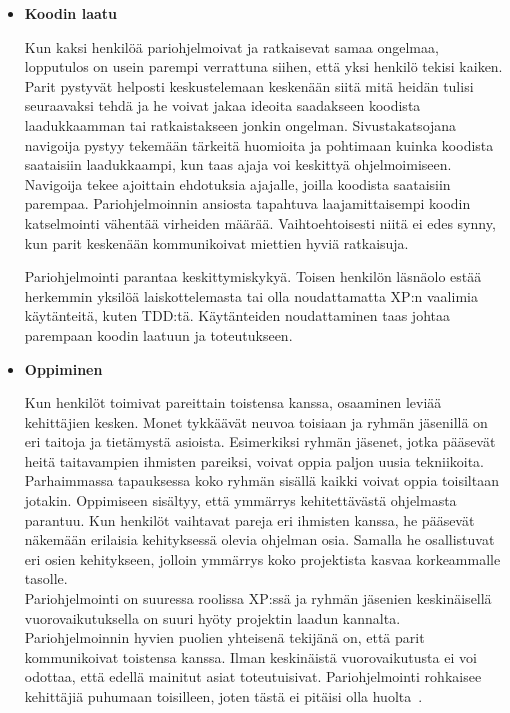 \documentclass[finnish]{../tktltiki2}
\theoremstyle{definition}
\theoremstyle{remark}
\begin{document}
\begin{itemize}

\item {\bf Koodin laatu}

Kun kaksi henkilöä pariohjelmoivat ja ratkaisevat samaa ongelmaa, 
lopputulos on usein parempi verrattuna siihen, että yksi henkilö 
tekisi kaiken. Parit pystyvät helposti keskustelemaan keskenään siitä 
mitä heidän tulisi seuraavaksi tehdä ja he voivat jakaa ideoita 
saadakseen koodista laadukkaamman tai ratkaistakseen jonkin ongelman. 
Sivustakatsojana navigoija pystyy tekemään tärkeitä huomioita ja 
pohtimaan kuinka koodista saataisiin laadukkaampi, kun taas ajaja voi 
keskittyä ohjelmoimiseen. Navigoija tekee ajoittain ehdotuksia 
ajajalle, joilla koodista saataisiin parempaa.
Pariohjelmoinnin ansiosta tapahtuva laajamittaisempi koodin 
katselmointi vähentää virheiden määrää. Vaihtoehtoisesti
niitä ei edes synny, kun parit keskenään kommunikoivat miettien hyviä 
ratkaisuja.

Pariohjelmointi parantaa keskittymiskykyä. Toisen henkilön 
läsnäolo estää herkemmin yksilöä laiskottelemasta tai olla noudattamatta XP:n
vaalimia käytänteitä, kuten TDD:tä. Käytänteiden noudattaminen taas 
johtaa parempaan koodin laatuun ja toteutukseen.

\item {\bf Oppiminen}

Kun henkilöt toimivat pareittain toistensa kanssa, osaaminen 
leviää kehittäjien kesken. Monet tykkäävät neuvoa toisiaan ja ryhmän 
jäsenillä
on eri taitoja ja tietämystä asioista. Esimerkiksi ryhmän jäsenet, 
jotka pääsevät heitä taitavampien ihmisten pareiksi, voivat oppia
paljon uusia tekniikoita. Parhaimmassa tapauksessa koko ryhmän sisällä 
kaikki voivat oppia toisiltaan jotakin.
Oppimiseen sisältyy, että ymmärrys kehitettävästä ohjelmasta 
parantuu. Kun henkilöt vaihtavat
pareja eri ihmisten kanssa, he pääsevät näkemään erilaisia 
kehityksessä olevia ohjelman osia. Samalla he osallistuvat 
eri osien
kehitykseen, jolloin ymmärrys koko projektista kasvaa korkeammalle 
tasolle.\\

Pariohjelmointi on suuressa roolissa 
XP:ssä ja ryhmän jäsenien keskinäisellä vuorovaikutuksella on suuri 
hyöty projektin laadun kannalta. Pariohjelmoinnin 
hyvien puolien yhteisenä tekijänä on, että parit kommunikoivat 
toistensa kanssa. Ilman keskinäistä vuorovaikutusta ei voi odottaa, 
että edellä mainitut asiat toteutuisivat. Pariohjelmointi 
rohkaisee kehittäjiä puhumaan toisilleen, joten tästä ei pitäisi olla 
huolta~\cite{Zarb:2012:UCW:2384716.2384738}.

\end{itemize}
\end{document}
